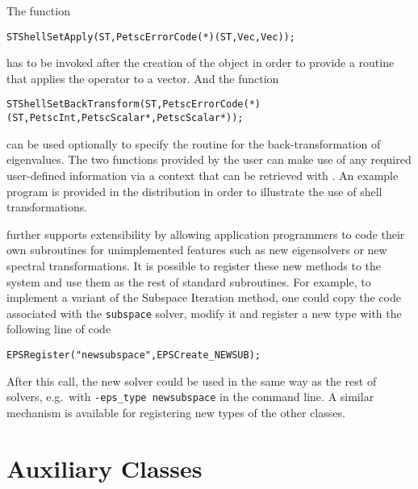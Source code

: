 	The function
	\begin{Verbatim}[fontsize=\small]
      STShellSetApply(ST,PetscErrorCode(*)(ST,Vec,Vec));
	\end{Verbatim}
has to be invoked after the creation of the  object in order to provide a routine that applies the operator to a vector. And the function
	\begin{Verbatim}[fontsize=\small]
      STShellSetBackTransform(ST,PetscErrorCode(*)(ST,PetscInt,PetscScalar*,PetscScalar*));
	\end{Verbatim}
can be used optionally to specify the routine for the back-transformation of eigenvalues. The two functions provided by the user can make use of any required user-defined information via a context that can be retrieved with . An example program is provided in the \slepc distribution in order to illustrate the use of shell transformations.

	\slepc further supports extensibility by allowing application programmers to code their own subroutines for unimplemented features such as new eigensolvers or new spectral transformations. It is possible to register these new methods to the system and use them as the rest of standard subroutines. For example, to implement a variant of the Subspace Iteration method, one could copy the \slepc code associated with the \texttt{subspace} solver, modify it and register a new  type with the following line of code
	\begin{Verbatim}[fontsize=\small]
	EPSRegister("newsubspace",EPSCreate_NEWSUB);
	\end{Verbatim}
After this call, the new solver could be used in the same way as the rest of \slepc solvers, e.g.\ with \texttt{-eps\_type newsubspace} in the command line.
	A similar mechanism is available for registering new types of the other classes.

\section{Auxiliary Classes}
\label{sec:sys}

